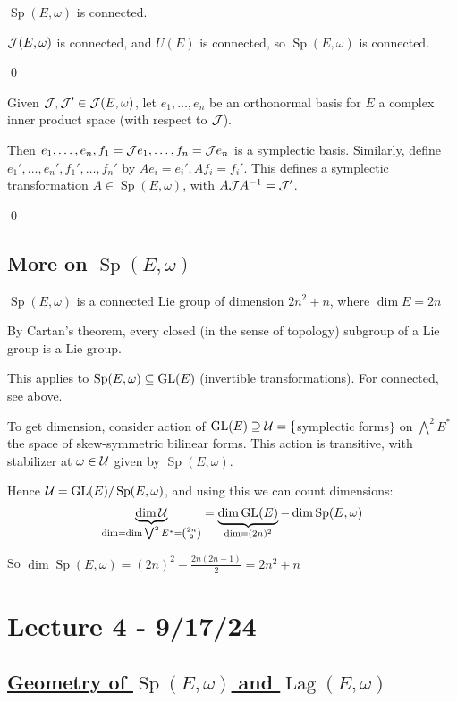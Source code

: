 \documentclass[x11names,reqno,14pt]{extarticle}
\newcommand{\J}{\mc{J}}
\newcommand{\spew}{\Sp(E,\omega)}
\newcommand{\jew}{\mc{J}(E,\omega)}
\DeclareMathOperator{\Sp}{Sp}
\DeclareMathOperator{\Lag}{Lag}
\begin{document}
\cor

$\Sp(E,\omega)$ is connected. 

\proof

$\mathcal{J}(E,\omega)$ is connected, and $U(E)$ is connected, so $\spew$ is connected. 

\qed

\proof

Given $\mc{J}, \mc{J}' \in \jew$, let $e_1, \dots, e_n$ be an orthonormal basis for $E$ a complex inner product space (with respect to $\mathcal{J}$).

Then $e_1, \dots, e_n, f_1 = \mathcal{J}e_1, \dots, f_n = \mathcal{J}e_n$ is a symplectic basis. Similarly, define $e_1', \dots, e_n', f_1', \dots, f_n'$ by $Ae_i = e_i', Af_i = f_i'$. This defines a symplectic transformation $A \in \spew$, with $A\J A^{-1} = \J'$.

\qed

\subsection*{More on $\spew$}

\prop

$\spew$ is a connected Lie group of dimension $2n^2 + n$, where $\dim E = 2n$

\proof

By Cartan's theorem, every closed (in the sense of topology) subgroup of a Lie group is a Lie group. 

This applies to $\spew \subseteq \GL(E)$ (invertible transformations). For connected, see above. 

To get dimension, consider action of ${\mathrm{GL}}(E)\supseteq \mathcal{U} = \{$symplectic forms$\}$ on $\bigwedge^2 E^*$ the space of skew-symmetric bilinear forms.  This action is transitive, with stabilizer at $\omega \in \mathcal{U}$ given by $\spew$. 

Hence $\mc{U} = \GL(E)/\spew$, and using this we can count dimensions:
\[
\underbrace{\dim \mc{U}}_{\dim = \dim\bigvee^2 E^* = {2n\choose 2}} = \underbrace{\dim \GL(E)}_{\dim = (2n)^2} - \dim \spew
\]

So $\dim \spew = (2n)^2 - \frac{2n(2n-1)}{2} = 2n^2 + n$ 

\section*{Lecture 4 - 9/17/24}

\subsection*{\underline{Geometry of $\spew$ and $\Lag(E,\omega)$}}
\end{document}
